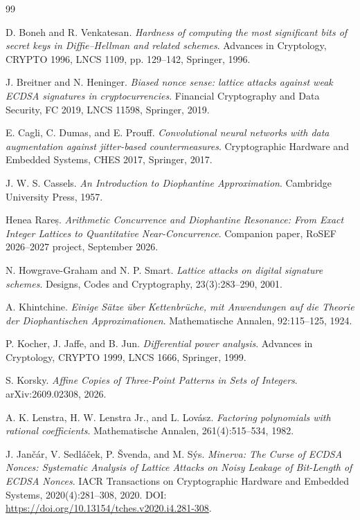 \documentclass[11pt,a4paper]{article}
\begin{document}
\begin{thebibliography}{99}

D. Boneh and R. Venkatesan.
\emph{Hardness of computing the most significant bits of secret keys in Diffie--Hellman and related schemes}.
Advances in Cryptology, CRYPTO 1996, LNCS 1109, pp. 129--142, Springer, 1996.

J. Breitner and N. Heninger.
\emph{Biased nonce sense: lattice attacks against weak ECDSA signatures in cryptocurrencies}.
Financial Cryptography and Data Security, FC 2019, LNCS 11598, Springer, 2019.

E. Cagli, C. Dumas, and E. Prouff.
\emph{Convolutional neural networks with data augmentation against jitter-based countermeasures}.
Cryptographic Hardware and Embedded Systems, CHES 2017, Springer, 2017.

J. W. S. Cassels.
\emph{An Introduction to Diophantine Approximation}.
Cambridge University Press, 1957.

Henea Rareș.
\emph{Arithmetic Concurrence and Diophantine Resonance: From Exact Integer Lattices to Quantitative Near-Concurrence}.
Companion paper, RoSEF 2026--2027 project, September 2026.

N. Howgrave-Graham and N. P. Smart.
\emph{Lattice attacks on digital signature schemes}.
Designs, Codes and Cryptography, 23(3):283--290, 2001.

A. Khintchine.
\emph{Einige Sätze über Kettenbrüche, mit Anwendungen auf die Theorie der Diophantischen Approximationen}.
Mathematische Annalen, 92:115--125, 1924.

P. Kocher, J. Jaffe, and B. Jun.
\emph{Differential power analysis}.
Advances in Cryptology, CRYPTO 1999, LNCS 1666, Springer, 1999.

S. Korsky.
\emph{Affine Copies of Three-Point Patterns in Sets of Integers}.
arXiv:2609.02308, 2026.

A. K. Lenstra, H. W. Lenstra Jr., and L. Lovász.
\emph{Factoring polynomials with rational coefficients}.
Mathematische Annalen, 261(4):515--534, 1982.

J. Jan\v{c}\'ar, V. Sedl\'a\v{c}ek, P. \v{S}venda, and M. S\'ys.
\emph{Minerva: The Curse of ECDSA Nonces: Systematic Analysis of Lattice Attacks on Noisy Leakage of Bit-Length of ECDSA Nonces}.
IACR Transactions on Cryptographic Hardware and Embedded Systems, 2020(4):281--308, 2020.
DOI: \url{https://doi.org/10.13154/tches.v2020.i4.281-308}.


\end{thebibliography}
\end{document}

